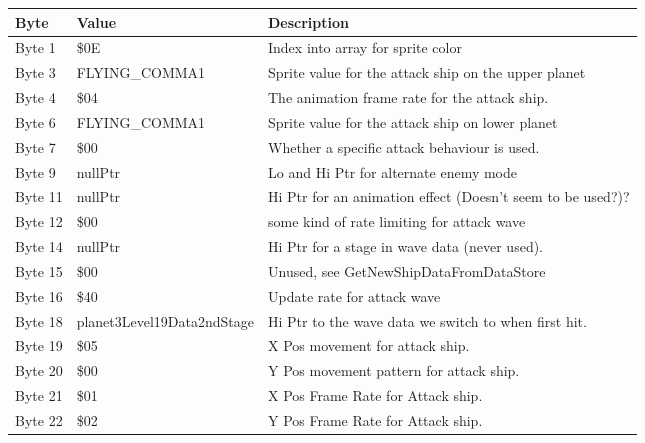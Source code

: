 \begin{figure}[H]
{\begin{adjustbox}{width=12cm}
\begin{tabular}{lll}
\toprule
 Byte    & Value                      & Description                                                        \\
\midrule
 Byte 1  & \$0E                        & Index into array for sprite color                                  \\
 Byte 3  & FLYING\_COMMA1              & Sprite value for the attack ship on the upper planet               \\
 Byte 4  & \$04                        & The animation frame rate for the attack ship.                      \\
 Byte 6  & FLYING\_COMMA1              & Sprite value for the attack ship on lower planet                   \\
 Byte 7  & \$00                        & Whether a specific attack behaviour is used.                       \\
 Byte 9  & nullPtr                    & Lo and Hi Ptr for alternate enemy mode                             \\
 Byte 11 & nullPtr                    & Hi Ptr for an animation effect (Doesn't seem to be used?)?         \\
 Byte 12 & \$00                        & some kind of rate limiting for attack wave                         \\
 Byte 14 & nullPtr                    & Hi Ptr for a stage in wave data (never used).                      \\
 Byte 15 & \$00                        & Unused, see GetNewShipDataFromDataStore                            \\
 Byte 16 & \$40                        & Update rate for attack wave                                        \\
 Byte 18 & planet3Level19Data2ndStage & Hi Ptr to the wave data we switch to when first hit.               \\
 Byte 19 & \$05                        & X Pos movement for attack ship.                                    \\
 Byte 20 & \$00                        & Y Pos movement pattern for attack ship.                            \\
 Byte 21 & \$01                        & X Pos Frame Rate for Attack ship.                                  \\
 Byte 22 & \$02                        & Y Pos Frame Rate for Attack ship.                                  \\

\end{tabular}
\end{adjustbox}}
\end{figure}
